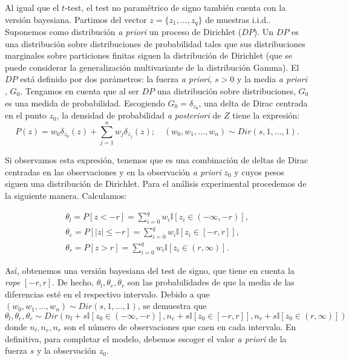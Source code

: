 	Al igual que el $t$-test, el test no paramétrico de 
signo también cuenta con la versión bayesiana. Partimos
del vector $z = \{z_1, \dots, z_q\}$ de muestras i.i.d.. 
Suponemos como distribución \textit{a priori} un proceso
de Dirichlet ($DP$). Un $DP$ es una distribución sobre 
distribuciones de probabilidad tales que sus distribuciones
marginales sobre particiones finitas siguen la distribución
de Dirichlet (que se puede considerar la generalización
multivariante de la distribución Gamma). El $DP$ está
definido por dos parámetros: la fuerza \textit{a priori},
$s>0$ y la media \textit{a priori} , $G_0$. Tengamos en 
cuenta que al ser $DP$ una distribución sobre distribuciones,
$G_0$ es una medida de probabilidad. Escogiendo $G_0 = 
\delta_{z_0}$, una delta de Dirac centrada en el punto $z_0$,
la densidad de probabilidad \textit{a posteriori} de $Z$ tiene la
expresión:
	\[ P(z) = 
		w_0 \delta_{z_0}(z) +
			\sum\limits_{j=1}^n
				w_j \delta_{z_j}(z); \quad
		(w_0, w_1, \dots, w_n) \sim Dir(s,1, \dots, 1).
	\] 
	
	Si observamos esta expresión, tenemos que es una 
combinación de deltas de Dirac centradas en las observaciones
y en la observación \textit{a priori} $z_0$ y cuyos pesos
siguen una distribución de Dirichlet. Para el análisis
experimental procedemos de la siguiente manera. Calculamos:

\begin{align*}
	\theta_l = P[ z < -r ] = 
				\sum\limits_{i = 0}^q 
					w_i \mathbb{I}[ z_i \in (-\infty,-r)],\\
	\theta_e = P[ |z| \leq -r ] = 
				\sum\limits_{i = 0}^q 
					w_i \mathbb{I}[ z_i \in [-r,r]], \\
	\theta_r = P[ z > r ] = 
				\sum\limits_{i = 0}^q 
					w_i \mathbb{I}[ z_i \in (r, \infty)].
\end{align*}

	Así, obtenemos una versión bayesiana del test de signo, 
que tiene en cuenta la \textit{rope} $[-r,r]$. De hecho, $\theta_l,
\theta_e, \theta_r$ son las probabilidades de que la media
de las diferencias esté en el respectivo intervalo. 
Debido a que $(w_0, w_1, \dots, w_n) \sim Dir(s,1, \dots, 
1)$, se demuestra que
	\[ 
		\theta_l,\theta_e, \theta_r \sim
		Dir(n_l + s \mathbb{I}[ z_0 \in (-\infty,-r) ],
			n_e + s \mathbb{I}[ z_0 \in [-r,r] ],
			n_r + s \mathbb{I}[ z_0 \in (r, \infty) ])
	\]
	donde $n_l, n_e, n_r$ son el número de observaciones 
que caen en cada intervalo. En definitiva, para 
completar el modelo, debemos escoger el valor \textit{a 
priori} de la fuerza $s$ y la observación $z_0$.\\

